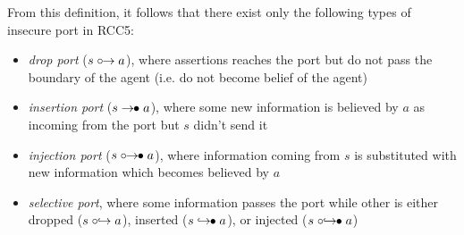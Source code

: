 From this definition, it follows that there exist only the following types of insecure port in RCC5:
\begin{itemize}
	\item \emph{drop port} ($s\mathrel{\circ\!\!\rightarrow} a$), where assertions reaches the port but do not pass the boundary of the agent (i.e. do not become belief of the agent)
	\item \emph{insertion port} ($s\mathrel{\rightarrow\!\!\bullet} a$), where some new information is believed by $a$ as incoming from the port but $s$ didn't send it
	\item \emph{injection port} ($s\mathrel{\circ\!\!\rightarrow\!\!\bullet} a$), where information coming from $s$ is substituted with new information which becomes believed by $a$
	\item \emph{selective port}, where some
		information passes the port while other is either dropped
		($s\mathrel{\circ\!\!\hookrightarrow} a$), inserted
		($s\mathrel{\hookrightarrow\!\!\bullet} a$), or injected
		($s\mathrel{\circ\!\!\hookrightarrow\!\!\bullet} a$)
\end{itemize}

